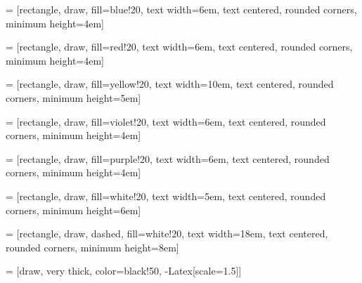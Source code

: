 
 = [rectangle, draw, fill=blue!20,
    text width=6em, text centered, rounded corners, minimum height=4em]
    
 = [rectangle, draw, fill=red!20,
    text width=6em, text centered, rounded corners, minimum height=4em]
    
 = [rectangle, draw, fill=yellow!20,
    text width=10em, text centered, rounded corners, minimum height=5em]
    
 = [rectangle, draw, fill=violet!20,
    text width=6em, text centered, rounded corners, minimum height=4em]
    
 = [rectangle, draw, fill=purple!20,
    text width=6em, text centered, rounded corners, minimum height=4em]
    
 = [rectangle, draw, fill=white!20,
    text width=5em, text centered, rounded corners, minimum height=6em]
    
 = [rectangle, draw, dashed, fill=white!20,
    text width=18em, text centered, rounded corners, minimum height=8em]
    
 = [draw, very thick, color=black!50, -{Latex[scale=1.5]}]

